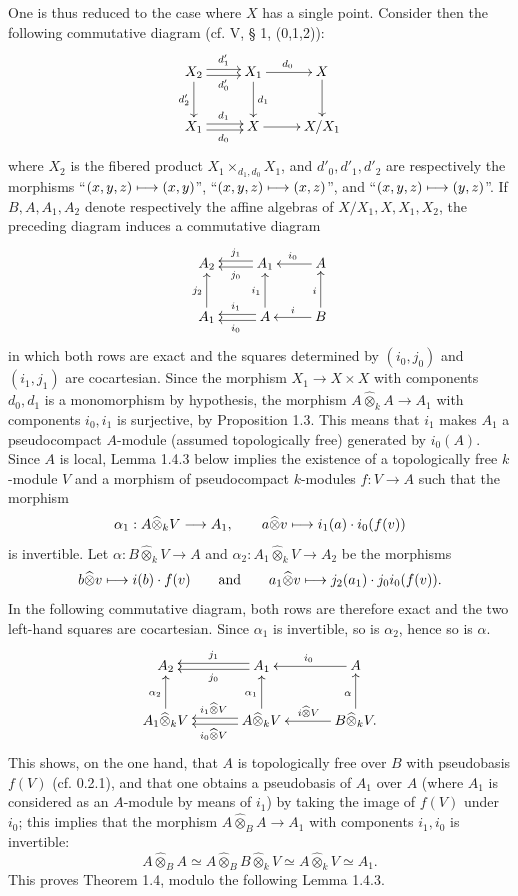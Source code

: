 One is thus reduced to the case where $X$ has a single point. Consider then the following commutative diagram (cf. V, § 1, (0,1,2)):
\[
\xymatrix{
X_2\ar@<.5ex>[r]^{d'_1}\ar@<-.5ex>[r]_{d'_0}\ar[d]_{d'_2}&X_1\ar[r]^{d_0}\ar[d]^{d_1}&X\ar[d]\\
X_1\ar@<.5ex>[r]^{d_1}\ar@<-.5ex>[r]_{d_0}&X\ar[r]&X/X_1}
\]
where $X_2$ is the fibered product $X_1\times_{d_1,d_0}X_1$, and $d'_0,d'_1,d'_2$ are respectively the morphisms ``$(x,y,z)\longmapsto(x,y)$'', ``$(x,y,z)\longmapsto(x,z)$'', and ``$(x,y,z)\longmapsto(y,z)$''.
If $B,A,A_1,A_2$ denote respectively the affine algebras of $X/X_1,X,X_1,X_2$, the preceding diagram induces a commutative diagram
\[
\xymatrix{
A_2&A_1\ar@<-.5ex>[l]_{j_1}\ar@<.5ex>[l]^{j_0}&A\ar[l]_{i_0}\\
A_1\ar[u]^{j_2}&A\ar[u]^{i_1}\ar@<-.5ex>[l]_{i_1}\ar@<.5ex>[l]^{i_0}&B\ar[u]^i\ar[l]_i}
\]
in which both rows are exact and the squares determined by $(i_0,j_0)$ and $(i_1,j_1)$ are cocartesian. Since the morphism $X_1\to X\times X$ with components $d_0,d_1$ is a monomorphism by hypothesis, the morphism $A\widehat\otimes_k A\to A_1$ with components $i_0,i_1$ is surjective, by Proposition 1.3.
This means that $i_1$ makes $A_1$ a pseudocompact $A$-module (assumed topologically free) generated by $i_0(A)$. Since $A$ is local, Lemma 1.4.3 below implies the existence of a topologically free $k$-module $V$ and a morphism of pseudocompact $k$-modules $f:V\to A$ such that the morphism
\[
\alpha_1:A\widehat\otimes_k V\longrightarrow A_1,\qquad a\widehat\otimes v\longmapsto i_1(a)\cdot i_0(f(v))
\]
is invertible. Let $\alpha:B\widehat\otimes_k V\to A$ and $\alpha_2:A_1\widehat\otimes_k V\to A_2$ be the morphisms
\[
b\widehat\otimes v\longmapsto i(b)\cdot f(v)\qquad\text{and}\qquad
a_1\widehat\otimes v\longmapsto j_2(a_1)\cdot j_0i_0(f(v)).
\]
In the following commutative diagram, both rows are therefore exact and the two left-hand squares are cocartesian. Since $\alpha_1$ is invertible, so is $\alpha_2$, hence so is $\alpha$.
\[
\xymatrix@C=32pt{
A_2&A_1\ar@<-.5ex>[l]_{j_1}\ar@<.5ex>[l]^{j_0}&A\ar[l]_{i_0}\\
A_1\widehat\otimes_k V\ar[u]^{\alpha_2}&A\widehat\otimes_k V\ar[u]^{\alpha_1}\ar@<-.5ex>[l]_{i_1\widehat\otimes V}\ar@<.5ex>[l]^{i_0\widehat\otimes V}&B\widehat\otimes_k V\ar[u]^\alpha\ar[l]_{i\widehat\otimes V}.}
\]
This shows, on the one hand, that $A$ is topologically free over $B$ with pseudobasis $f(V)$ (cf. 0.2.1), and that one obtains a pseudobasis of $A_1$ over $A$ (where $A_1$ is considered as an $A$-module by means of $i_1$) by taking the image of $f(V)$ under $i_0$; this implies that the morphism $A\widehat\otimes_B A\to A_1$ with components $i_1,i_0$ is invertible:
\[
A\widehat\otimes_B A\simeq A\widehat\otimes_B B\widehat\otimes_k V\simeq A\widehat\otimes_k V\simeq A_1.
\]
This proves Theorem 1.4, modulo the following Lemma 1.4.3.

